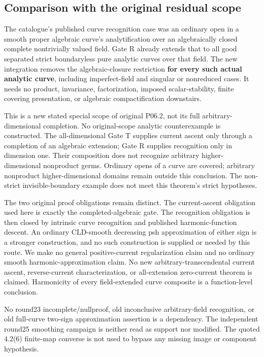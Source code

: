 \documentclass[
  11pt,
]{article}
\begin{document}
\subsection{Comparison with the original residual
scope}\label{comparison-with-the-original-residual-scope}

The catalogue's published curve recognition case was an ordinary open in
a smooth proper algebraic curve's analytification over an algebraically
closed complete nontrivially valued field. Gate R already extends that
to all good separated strict boundaryless pure analytic curves over that
field. The new integration removes the algebraic-closure restriction
\textbf{for every such actual analytic curve}, including imperfect-field
and singular or nonreduced cases. It needs no product, invariance,
factorization, imposed scalar-stability, finite covering presentation,
or algebraic compactification downstairs.

This is a new stated special scope of original P06.2, not its full
arbitrary-dimensional completion. No original-scope analytic
counterexample is constructed. The all-dimensional Gate T supplies
current ascent only through a completion of an algebraic extension; Gate
R supplies recognition only in dimension one. Their composition does not
recognize arbitrary higher-dimensional nonproduct germs. Ordinary opens
of a curve are covered; arbitrary nonproduct higher-dimensional domains
remain outside this conclusion. The non-strict invisible-boundary
example does not meet this theorem's strict hypotheses.

The two original proof obligations remain distinct. The current-ascent
obligation used here is exactly the completed-algebraic gate. The
recognition obligation is then closed by intrinsic curve recognition and
published harmonic-function descent. An ordinary CLD-smooth decreasing
psh approximation of either sign is a stronger construction, and no such
construction is supplied or needed by this route. We make no general
positive-current regularization claim and no ordinary smooth
harmonic-approximation claim. No new arbitrary-transcendental current
ascent, reverse-current characterization, or all-extension zero-current
theorem is claimed. Harmonicity of every field-extended curve composite
is a function-level conclusion.

No round23 incomplete/nullproof, old inconclusive arbitrary-field
recognition, or old full-curve two-sign approximation assertion is a
dependency. The independent round25 smoothing campaign is neither read
as support nor modified. The quoted 4.2(6) finite-map converse is not
used to bypass any missing image or component hypothesis.
\end{document}
